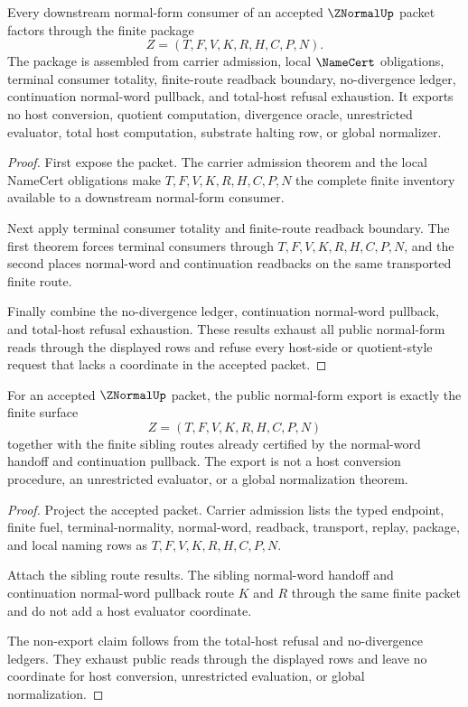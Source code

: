 \begin{theorem}
\label{thm:znormal-downstream-normal-form-package}
Every downstream normal-form consumer of an accepted $\ZNormalUp$ packet factors through the finite package
$$
Z=(T,F,V,K,R,H,C,P,N).
$$
The package is assembled from carrier admission, local $\NameCert$ obligations, terminal consumer totality, finite-route readback boundary, no-divergence ledger, continuation normal-word pullback, and total-host refusal exhaustion. It exports no host conversion, quotient computation, divergence oracle, unrestricted evaluator, total host computation, substrate halting row, or global normalizer.
\end{theorem}
\begin{proof}
First expose the packet. The carrier admission theorem and the local NameCert obligations make $T,F,V,K,R,H,C,P,N$ the complete finite inventory available to a downstream normal-form consumer.

Next apply terminal consumer totality and finite-route readback boundary. The first theorem forces terminal consumers through $T,F,V,K,R,H,C,P,N$, and the second places normal-word and continuation readbacks on the same transported finite route.

Finally combine the no-divergence ledger, continuation normal-word pullback, and total-host refusal exhaustion. These results exhaust all public normal-form reads through the displayed rows and refuse every host-side or quotient-style request that lacks a coordinate in the accepted packet.
\end{proof}

\begin{theorem}
\label{thm:znormal-root-public-normal-form-export}
For an accepted $\ZNormalUp$ packet, the public normal-form export is exactly
the finite surface
$$
Z=(T,F,V,K,R,H,C,P,N)
$$
together with the finite sibling routes already certified by the normal-word
handoff and continuation pullback. The export is not a host conversion
procedure, an unrestricted evaluator, or a global normalization theorem.
\end{theorem}
\begin{proof}
Project the accepted packet. Carrier admission lists the typed endpoint,
finite fuel, terminal-normality, normal-word, readback, transport, replay,
package, and local naming rows as $T,F,V,K,R,H,C,P,N$.

Attach the sibling route results. The sibling normal-word handoff and
continuation normal-word pullback route $K$ and $R$ through the same finite
packet and do not add a host evaluator coordinate.

The non-export claim follows from the total-host refusal and no-divergence
ledgers. They exhaust public reads through the displayed rows and leave no
coordinate for host conversion, unrestricted evaluation, or global
normalization.
\end{proof}

